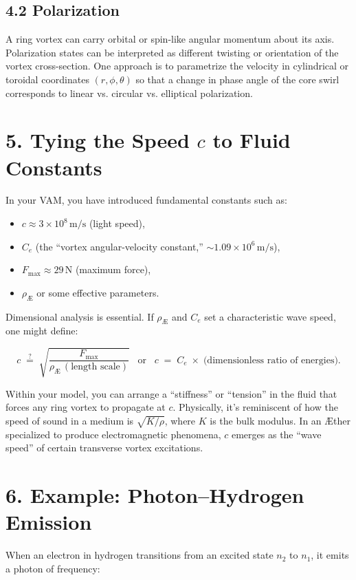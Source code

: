\subsection*{4.2 Polarization}
A ring vortex can carry orbital or spin-like angular momentum about its axis. Polarization states can be interpreted as different twisting or orientation of the vortex cross-section. One approach is to parametrize the velocity in cylindrical or toroidal coordinates \((r,\phi,\theta)\) so that a change in phase angle of the core swirl corresponds to linear vs. circular vs. elliptical polarization.

\section*{5. Tying the Speed \(c\) to Fluid Constants}
In your VAM, you have introduced fundamental constants such as:

\begin{itemize}
 \item \(c \approx 3\times10^8\,\mathrm{m/s}\) (light speed),
 \item \(C_e\) (the “vortex angular-velocity constant,” \(\sim 1.09\times10^6\,\mathrm{m/s}\)),
 \item \(F_{\max} \approx 29\,\mathrm{N}\) (maximum force),
 \item \(\rho_{\scriptscriptstyle\mathrm{Æ}}\) or some effective parameters.
\end{itemize}

Dimensional analysis is essential. If \(\rho_{\scriptscriptstyle \mathrm{Æ}}\) and \(C_e\) set a characteristic wave speed, one might define:

\[
 c \;\stackrel{?}{=}\; \sqrt{ \frac{F_{\max}}{\rho_{\scriptscriptstyle \mathrm{Æ}}\,(\text{length scale})} } \;\;\;\text{or}\;\;\; c \;=\; C_e \;\times\; \bigl(\text{dimensionless ratio of energies}\bigr).
\]

Within your model, you can arrange a “stiffness” or “tension” in the fluid that forces any ring vortex to propagate at \(c\). Physically, it’s reminiscent of how the speed of sound in a medium is \(\sqrt{K/\rho}\), where \(K\) is the bulk modulus. In an Æther specialized to produce electromagnetic phenomena, \(c\) emerges as the “wave speed” of certain transverse vortex excitations.

\section*{6. Example: Photon–Hydrogen Emission}
When an electron in hydrogen transitions from an excited state \(n_2\) to \(n_1\), it emits a photon of frequency:

